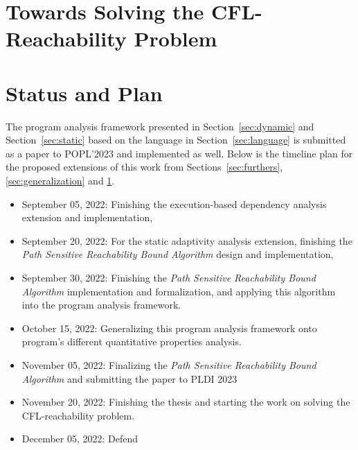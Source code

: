 \documentclass[a4paper,11pt]{article}
\begin{document}
\section{Towards Solving the CFL-Reachability Problem}
\label{sec:cfl_reduction}


\section{Status and Plan}
The program analysis framework presented in Section~\ref{sec:dynamic} and Section~\ref{sec:static} 
based on the language in Section~\ref{sec:language}
 is submitted as a paper to POPL'2023 and implemented as well. 
 Below is the timeline plan for the proposed extensions of this work
 from Sections~\ref{sec:furthers}, \ref{sec:generalization} and \ref{sec:cfl_reduction}.
\begin{itemize}
\item September 05, 2022: Finishing the execution-based dependency analysis extension and implementation,
\item September 20, 2022: For the static adaptivity analysis extension, 
finishing the \emph{Path Sensitive Reachability Bound Algorithm} design and implementation, 
\item September 30, 2022: Finishing the \emph{Path Sensitive Reachability Bound Algorithm} implementation and formalization, 
and applying this algorithm into the program analysis framework.
\item October 15, 2022:  Generalizing this program analysis framework onto program's different quantitative properties analysis.
\item November 05, 2022: Finalizing the \emph{Path Sensitive Reachability Bound Algorithm} and submitting the paper to PLDI 2023
\item November 20, 2022: Finishing the thesis and starting the work on solving the CFL-reachability problem.
\item December 05, 2022: Defend
\end{itemize}




\end{document}
